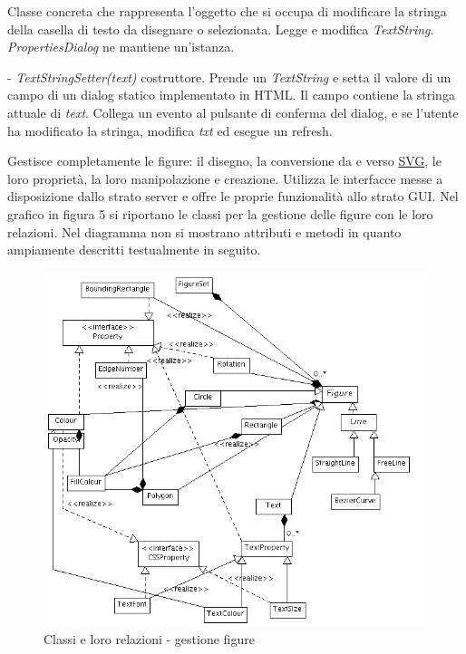 Classe concreta che rappresenta l'oggetto che si occupa di modificare la stringa della casella di testo da disegnare o selezionata.
Legge e modifica \textit{TextString}.
\textit{PropertiesDialog} ne mantiene un'istanza.
\begin{elencopuntato}[\subsubsecindent]
\item[-] \textit{TextStringSetter(text)} costruttore. Prende un \textit{TextString} e setta il valore di un campo di un dialog statico implementato in HTML. Il campo contiene la stringa attuale di \textit{text}. Collega un evento al pulsante di conferma del dialog, e se l'utente ha modificato la stringa, modifica \textit{txt} ed esegue un refresh.
\end{elencopuntato}


Gestisce completamente le figure: il disegno, la conversione da e verso \underline{SVG}, le loro propriet\`a, la loro manipolazione e creazione. Utilizza le interfacce messe a disposizione dallo strato server e offre le proprie funzionalit\`a allo strato GUI. Nel grafico in figura 5 si riportano le classi per la gestione delle figure con le loro relazioni. Nel diagramma non si mostrano attributi e metodi in quanto ampiamente descritti testualmente in seguito.

\begin{figure}[!ht]
\centering
\includegraphics[scale=0.5]{applogic_figures.png}
\caption{Classi e loro relazioni - gestione figure}
\end{figure}

